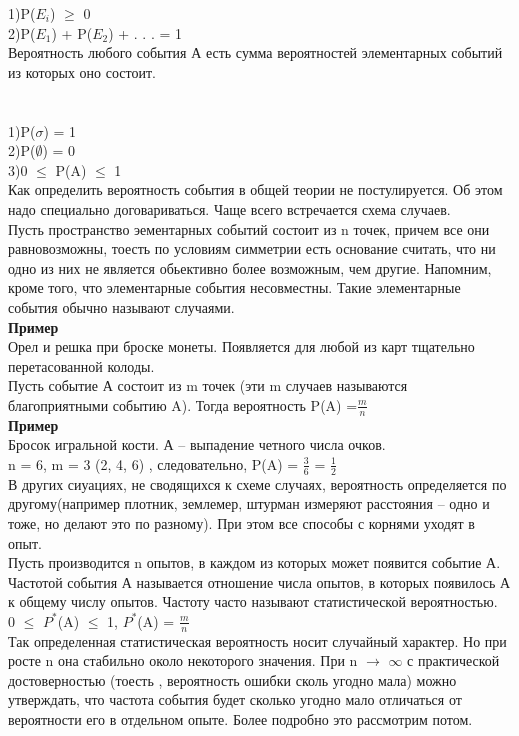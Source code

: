 \documentclass[russian, 12pt]{article}
\begin{document}
1)P($E_{i}$) $\geq$ 0  \\
2)P($E_{1}$) + P($E_{2}$) + . . . = 1\\
Вероятность любого события А есть сумма вероятностей элементарных событий из которых оно состоит.\\\\\\
1)P($\sigma$) = 1\\
2)P($\emptyset$) = 0\\
3)0 $\leq$ P(A) $\leq$ 1\\
Как определить вероятность события в общей теории не постулируется. Об этом надо специально договариваться. Чаще всего встречается схема случаев.\\
Пусть  пространство эементарных событий состоит из n точек, причем все они равновозможны, тоесть  по условиям симметрии есть основание считать, что ни одно из них не является обьективно более возможным, чем другие. Напомним, кроме того, что элементарные  события  
несовместны. Такие элементарные события обычно называют случаями.\\
\textbf{Пример}\\Орел и решка при броске монеты. Появляется для любой  из карт тщательно перетасованной колоды.\\
Пусть событие А состоит из m точек (эти m случаев называются благоприятными событию A). Тогда вероятность P(A)  =$\frac{m}{n}$\\
\textbf{Пример}\\Бросок игральной кости. А  -- выпадение четного числа очков.\\n = 6, m = 3 (2, 4, 6) , следовательно, P(A) = $\frac{3}{6}$ = $\frac{1}{2}$ \\
В других сиуациях, не сводящихся к схеме случаях, вероятность определяется по другому(например плотник, землемер, штурман измеряют расстояния -- одно и тоже, но делают это по разному). При этом все способы 
с корнями уходят в опыт.\\
Пусть производится n опытов, в каждом из которых может появится событие А. Частотой события А называется отношение числа опытов, в которых появилось А к общему числу опытов. Частоту часто называют статистической вероятностью.\\ 
 0 $\leq$ $P^*$(A) $\leq$ 1, $P^*$(A) = $\frac{m}{n}$\\
Так определенная статистическая вероятность носит случайный характер. Но при росте n она стабильно около некоторого значения. При n  $\rightarrow$  $\infty$ с практической достоверностью (тоесть , вероятность ошибки сколь угодно мала) можно утверждать, что частота события будет сколько угодно мало отличаться от вероятности его в отдельном опыте. Более подробно это рассмотрим потом.\\
\end{document}
